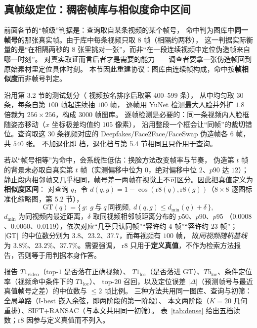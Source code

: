 \subsection{真帧级定位：稠密帧库与相似度命中区间}
\label{sec:dense-exp}

前面各节的“帧级”判据是：查询取自某条视频的某个帧号，
命中判为图库中\textbf{同一帧号}的那张真实帧。由于库中每条视频只取 $8$ 帧（相隔约两秒），
这一判据实际衡量的是“在相隔两秒的 $8$ 张里挑对一张”，而非“在一段连续视频中定位伪造帧来自哪一时刻”。
对真实取证而言后者才是需要的能力——调查者要拿一张伪造帧回到原始素材里定位具体时刻。
本节因此重建协议：图库由连续帧构成，命中按\textbf{帧相似度}而非帧号判定。

沿用第 3.2 节的测试划分（ 视频按名排序后取第 $400$–$599$ 条），
从中均匀取 $30$ 条，每条自第 $100$ 帧起连续抽 $100$ 帧，
逐帧用 YuNet 检测最大人脸并外扩 $1.8$ 倍裁为 $256\times256$，构成 $3000$ 帧图库。
逐帧检测是必要的：同一条视频内人脸框随姿态移动（$x$ 坐标极差均值约 $105$ 像素），
沿用整段一个框会让“同帧”的裁切错位。查询取这 $30$ 条视频对应的
Deepfakes$/$Face2Face$/$FaceSwap 伪造帧各 $6$ 帧，共 $540$ 张。
不加退化即  档，退化档与第 5.4 节相同且只作用于查询。

若以“帧号相等”为命中，会系统性低估：换脸方法改变帧率与节奏，
伪造第 $t$ 帧的背景未必取自真实第 $t$ 帧（实测偏移中位为 $0$，绝对偏移中位 $2$、$p90$ 达 $12$）；
静止段内相邻帧又几乎相同，帧号差一两帧在视觉上不可区分。因此把真值定义为\textbf{相似度区间}：
对查询 $q$，令 $d(q,g)=1-\cos(\mathrm{r8}(q),\mathrm{r8}(g))$（$8\times8$ 逐图标准化缩略图，第 5.2 节），
\begin{equation}
\mathrm{GT}(q)=\{\,g:\ g\ \text{与}\ q\ \text{同视频},\ d(q,g)\le d_{\min}(q)+\delta\,\},
\end{equation}
$d_{\min}$ 为同视频内最近距离，$\delta$ 取同视频相邻帧距离分布的 $p50$、$p90$、$p95$
（$0.0008$、$0.0060$、$0.0119$），依次对应“几乎只认同帧”“容许约 $4$ 帧”“容许约 $23$ 帧”；
$|{\rm GT}|$ 的中位数分别为 $3.8$、$23.2$、$37.7$，而每视频有 $100$ 帧，
故\emph{同视频随机基线}为 $3.8\%$、$23.2\%$、$37.7\%$。需要强调，
$\mathrm{r8}$ 只用于\textbf{定义真值}，不作为检索方法报告，否则等于用判据本身作答。

报告 $T1_{\text{video}}$（top-$1$ 是否落在正确视频）、
$T1_{\text{loc}}$（是否落进 $\mathrm{GT}$）、$T5_{\text{loc}}$、条件定位率（视频命中条件下的 $T1_{\text{loc}}$）、
top-$20$ 召回，以及定位误差 $|\Delta|$（预测帧号与最近真值帧号之差）的中位数与 $\le 2$ 帧比例。
三种方法共用同一图库、查询与初筛：全局单路（I-best 嵌入余弦，即两阶段的第一阶段）、
本文两阶段（$K=20$ 几何重排）、SIFT$+$RANSAC（与本文共用同一初筛）。
表~\ref{tab:dense} 给出五档读数；$\mathrm{r8}$ 因参与定义真值而不列入。

